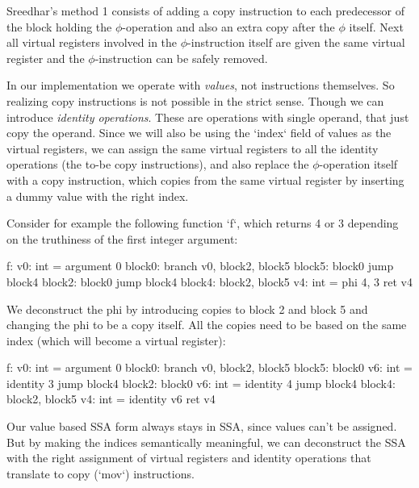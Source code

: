 Sreedhar's method 1 consists of adding a copy instruction to each predecessor of
the block holding the $\phi$-operation and also an extra copy after the $\phi$
itself. Next all virtual registers involved in the $\phi$-instruction itself are
given the same virtual register and the $\phi$-instruction can be safely
removed.

In our implementation we operate with {\em values}, not instructions themselves.
So realizing copy instructions is not possible in the strict sense. Though we
can introduce {\em identity operations}. These are operations with single
operand, that just copy the operand. Since we will also be using the `index`
field of values as the virtual registers, we can assign the same virtual
registers to all the identity operations (the to-be copy instructions), and also
replace the $\phi$-operation itself with a copy instruction, which copies from
the same virtual register by inserting a dummy value with the right index.

Consider for example the following function `f`, which returns 4 or 3 depending
on the truthiness of the first integer argument:

\begtt
f:
        v0: int = argument 0
block0:
        branch v0, block2, block5
block5: block0
        jump block4
block2: block0
        jump block4
block4: block2, block5
        v4: int = phi 4, 3
        ret v4
\endtt

We deconstruct the phi by introducing copies to block 2 and block 5 and changing
the phi to be a copy itself. All the copies need to be based on the same index
(which will become a virtual register):

\begtt
f:
        v0: int = argument 0
block0:
        branch v0, block2, block5
block5: block0
        v6: int = identity 3
        jump block4
block2: block0
        v6: int = identity 4
        jump block4
block4: block2, block5
        v4: int = identity v6
        ret v4
\endtt

Our value based SSA form always stays in SSA, since values can't be assigned.
But by making the indices semantically meaningful, we can deconstruct the SSA
with the right assignment of virtual registers and identity operations that
translate to copy (`mov`) instructions.

